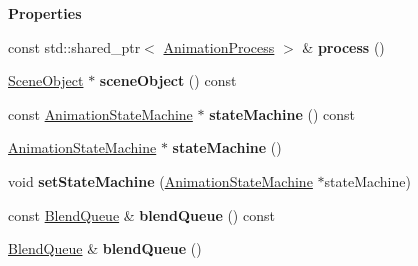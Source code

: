 \begin{Indent}\textbf{ Properties}\par
\begin{DoxyCompactItemize}
\item 
\mbox{\label{classrev_1_1_animation_controller_ab66ad4d409da8ecf24fe46698488d63a}} 
const std\+::shared\+\_\+ptr$<$ \mbox{\hyperlink{classrev_1_1_animation_process}{Animation\+Process}} $>$ \& {\bfseries process} ()
\item 
\mbox{\label{classrev_1_1_animation_controller_a5b8b7acad9125953bc06b1c1ec9ebeb0}} 
\mbox{\hyperlink{classrev_1_1_scene_object}{Scene\+Object}} $\ast$ {\bfseries scene\+Object} () const
\item 
\mbox{\label{classrev_1_1_animation_controller_ad7875a92031b008cf6e97c0316b6acc6}} 
const \mbox{\hyperlink{classrev_1_1_animation_state_machine}{Animation\+State\+Machine}} $\ast$ {\bfseries state\+Machine} () const
\item 
\mbox{\label{classrev_1_1_animation_controller_ae165e99494c8c88c13352edf5b2896cb}} 
\mbox{\hyperlink{classrev_1_1_animation_state_machine}{Animation\+State\+Machine}} $\ast$ {\bfseries state\+Machine} ()
\item 
\mbox{\label{classrev_1_1_animation_controller_a0ee5b18a516a9160343e45703d122bd6}} 
void {\bfseries set\+State\+Machine} (\mbox{\hyperlink{classrev_1_1_animation_state_machine}{Animation\+State\+Machine}} $\ast$state\+Machine)
\item 
\mbox{\label{classrev_1_1_animation_controller_a42acaeb1d552b92840a489d1faf92537}} 
const \mbox{\hyperlink{classrev_1_1_blend_queue}{Blend\+Queue}} \& {\bfseries blend\+Queue} () const
\item 
\mbox{\label{classrev_1_1_animation_controller_a1fb737a40cac83a6740a4d3a5ec6f200}} 
\mbox{\hyperlink{classrev_1_1_blend_queue}{Blend\+Queue}} \& {\bfseries blend\+Queue} ()
\end{DoxyCompactItemize}
\end{Indent}
